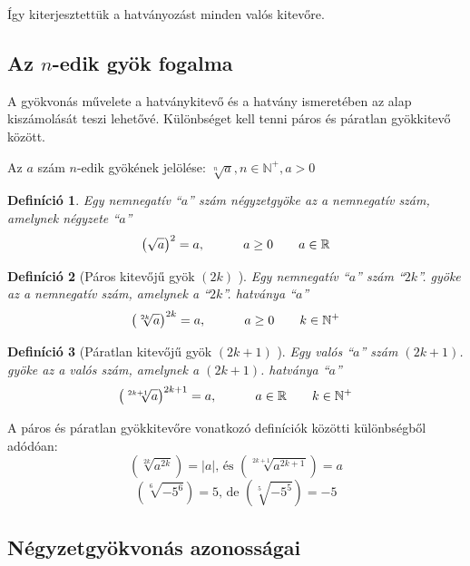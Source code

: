 \documentclass[12pt,a4paper]{article}
\newtheorem{definition}{Definíció} [section]
\begin{document}
Így kiterjesztettük a hatványozást minden valós kitevőre.

\subsection{Az $n$-edik gyök fogalma}

A gyökvonás művelete a hatványkitevő és a hatvány ismeretében az alap kiszámolását teszi lehetővé. Különbséget kell tenni páros és páratlan gyökkitevő között.

Az $a$ szám $n$-edik gyökének jelölése: $\sqrt[n]{a}, n \in \mathbb{N}^+,a>0$

\begin{definition}
Egy nemnegatív ``$a$'' szám négyzetgyöke az a nemnegatív szám, amelynek négyzete ``$a$''
$$\left(\sqrt{a}\right)^2=a,\hspace{30px}a\geq 0\hspace{20px} a \in \mathbb{R}$$
\end{definition}

\begin{definition}[Páros kitevőjű gyök $(2k)$ ]
Egy nemnegatív ``$a$'' szám ``$2k$''. gyöke az a nemnegatív szám, amelynek a ``$2k$''. hatványa ``$a$''
$$\left(\sqrt[2k]{a}\right)^{2k}=a,\hspace{30px}a\geq 0 \hspace{20px} k\in \mathbb{N}^+$$
\end{definition}

\begin{definition}[Páratlan kitevőjű gyök $(2k+1)$ ]
Egy valós ``$a$'' szám $(2k+1)$. gyöke az a valós szám, amelynek a $(2k+1)$. hatványa ``$a$''
$$\left(\sqrt[2k+1]{a}\right)^{2k+1}=a,\hspace{30px}a\in \mathbb{R} \hspace{20px} k\in \mathbb{N}^+$$
\end{definition}

A páros és páratlan gyökkitevőre vonatkozó definíciók közötti különbségből adódóan:
$$\left(\sqrt[2k]{a^{2k}}\right)=|a| \text{, és } \left(\sqrt[2k+1]{a^{2k+1}}\right)=a$$
$$\left(\sqrt[6]{-5^{6}}\right)=5 \text{, de } \left(\sqrt[5]{-5^{5}}\right)=-5$$


\subsection{Négyzetgyökvonás azonosságai}
\end{document}

